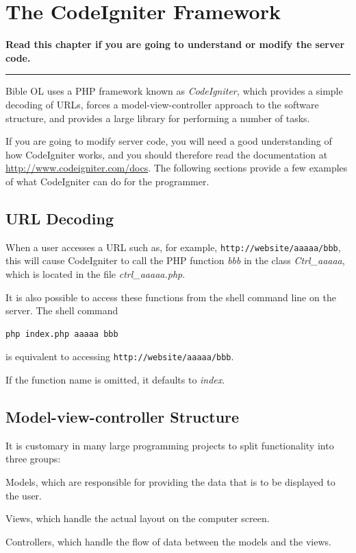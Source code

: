 \documentclass[11pt,oneside,a4paper]{memoir}
\begin{document}
\chapter{The CodeIgniter Framework}\label{chap-codeigniter-use}

\textbf{Read this chapter if you are going to understand or modify the server code.}
\plainbreak{3}

Bible OL uses a PHP framework known as \emph{CodeIgniter,} which provides a simple decoding of URLs,
forces a model-view-controller approach to the software structure, and provides a large library for
performing a number of tasks.

If you are going to modify server code, you will need a good understanding of how CodeIgniter works,
and you should therefore read the documentation at \url{http://www.codeigniter.com/docs}.
The following sections provide a few examples of what CodeIgniter can do for the programmer.

\section{URL Decoding}
\label{url-decoding}

When a user accesses a URL such as, for example, \texttt{http://website/aaaaa/bbb}, this will cause
CodeIgniter to call the PHP function \emph{bbb} in the class \emph{Ctrl\_aaaaa}, which is located in
the file \emph{ctrl\_aaaaa.php}.

It is also possible to access these functions from the shell command line on the server. The shell command

\begin{lstlisting}[language=bash]
php index.php aaaaa bbb
\end{lstlisting}

\noindent
is equivalent to accessing \texttt{http://website/aaaaa/bbb}.

If the function name is omitted, it defaults to \emph{index}.


\section{Model-view-controller Structure}

It is customary in many large programming projects to split functionality into three groups:

\begin{list}{-}{%
    \setlength{\itemsep}{0pt}%
    \setlength{\parsep}{0pt}%
    \setlength{\topsep}{\baselineskip}%
    \setlength{\partopsep}{0pt}%
  }
  \item Models, which are responsible for providing the data that is to be displayed to the user.
  \item Views, which handle the actual layout on the computer screen.
  \item Controllers, which handle the flow of data between the models and the views.
\end{list}
\end{document}
